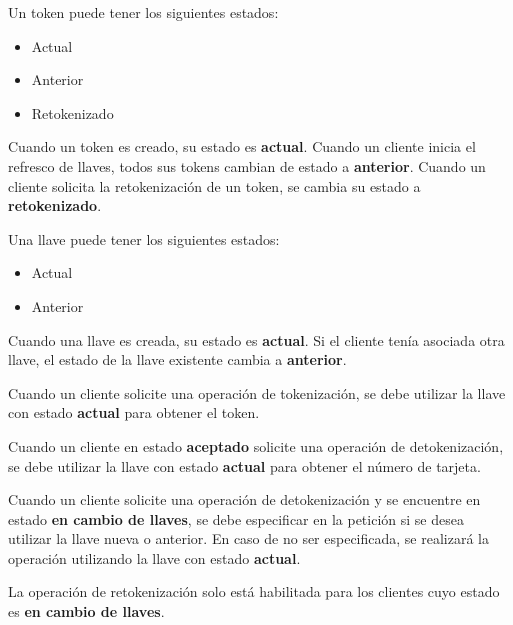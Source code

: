 {
  Un token puede tener los siguientes estados:
  \begin{itemize}
    \item Actual
    \item Anterior
    \item Retokenizado
  \end{itemize}

  Cuando un token es creado, su estado es \textbf{actual}.
  Cuando un cliente inicia el refresco de llaves, todos sus tokens cambian de
  estado a \textbf{anterior}.
  Cuando un cliente solicita la retokenización de un token, se cambia su estado
  a \textbf{retokenizado}.
}

{
  Una llave puede tener los siguientes estados:
  \begin{itemize}
    \item Actual
    \item Anterior
  \end{itemize}

  Cuando una llave es creada, su estado es \textbf{actual}. Si el cliente
  tenía asociada otra llave, el estado de la llave existente cambia a
  \textbf{anterior}.
}

{
  Cuando un cliente solicite una operación de tokenización, se debe utilizar la
  llave con estado \textbf{actual} para obtener el token.
}

{
  Cuando un cliente en estado \textbf{aceptado} solicite una operación de
  detokenización, se debe utilizar la llave con estado \textbf{actual}
  para obtener el número de tarjeta.
}

{
  Cuando un cliente solicite una operación de detokenización y se encuentre en
  estado \textbf{en cambio de llaves}, se debe especificar en la petición si
  se desea utilizar la llave nueva o anterior. En caso de no ser especificada,
  se realizará la operación utilizando la llave con estado \textbf{actual}.
}

{
  La operación de retokenización solo está habilitada para los clientes cuyo
  estado es \textbf{en cambio de llaves}.

}

